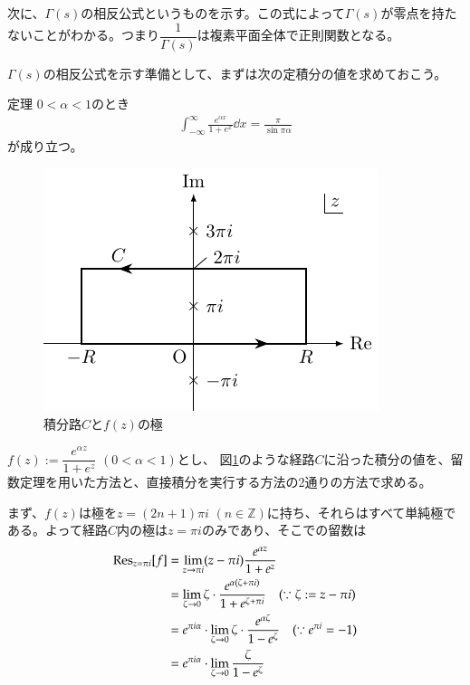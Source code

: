 \documentclass[11pt,b5paper,papersize,dvipdfmx]{jsbook}
\begin{document}
%
次に、$\Gamma(s)$の相反公式というものを示す。この式によって$\Gamma(s)$が零点を持たないことがわかる。つまり$\dfrac1{\Gamma(s)}$は複素平面全体で正則関数となる。\par
$\Gamma(s)$の相反公式を示す準備として、まずは次の定積分の値を求めておこう。
%
\begin{thm}{定理}
  $0 < \alpha < 1$のとき
  \begin{align}
    \int_{-\infty}^\infty \frac{e^{\alpha x}}{1+e^x}\dd{x}
    = \frac{\pi}{\sin \pi\alpha}
    \label{eq:int-sin}
  \end{align}
  が成り立つ。
\end{thm}
%
\clearpage
%
\begin{prf}
  \begin{figure}[H]
    \centering
    \includegraphics{nkym/fig/pi-sin}
    \caption{積分路$C$と$f(z)$の極}
    \label{fig:pi-sin}
  \end{figure}
  $f(z):=\dfrac{e^{\alpha z}}{1+e^z} \,\, (0<\alpha<1)$とし、
  図\ref{fig:pi-sin}のような経路$C$に沿った積分の値を、留数定理を用いた方法と、直接積分を実行する方法の2通りの方法で求める。\par
  まず、$f(z)$は極を$z=(2n+1)\pi i \,\, (n\in\mathbb{Z})$に持ち、それらはすべて単純極である。よって経路$C$内の極は$z=\pi i$のみであり、そこでの留数は
  \begin{align*}
    \Res_{z=\pi i}[f]
    &= \lim_{z\to\pi i} (z-\pi i) \frac{e^{\alpha z}}{1+e^z}\\
    &= \lim_{\zeta\to 0} \zeta \cdot \frac{e^{\alpha(\zeta+\pi i)}}{1+e^{\zeta+\pi i}} \quad (\because \zeta := z - \pi i)\\
    &= e^{\pi i \alpha}\cdot \lim_{\zeta\to 0} \zeta \cdot \frac{e^{\alpha\zeta}}{1-e^\zeta} \quad (\because e^{\pi i} = -1)\\
    &= e^{\pi i \alpha}\cdot \lim_{\zeta\to 0} \frac{\zeta}{1-e^\zeta}\\

\end{align*}
\end{prf}
\end{document}
